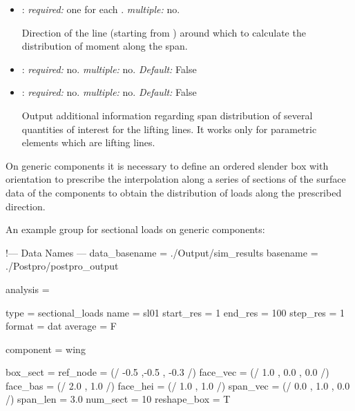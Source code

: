 \begin{itemize}
\item {}: \textit{required:} one for each . 
\textit{multiple:} no.

Direction of the line (starting from ) around which to calculate 
the distribution of moment along the span.

\item {}: \textit{required:} no. \textit{multiple:} no. 
\textit{Default:} False

\item {}: \textit{required:} no. \textit{multiple:} no. 
\textit{Default:} False

Output additional information regarding span distribution of several quantities 
of interest for the lifting lines. It works only for parametric elements which 
are lifting lines.

\end{itemize}

On generic components it is necessary to define an ordered slender box with 
orientation to prescribe the interpolation along a series of sections of the 
surface data of the components to obtain the distribution of loads along the 
prescribed direction.

An example  group for sectional loads on generic components:

\begin{inputfile}[frame=single, caption={dust\_post.in for sectional load on 
  generic components}, label={file:dust_post.in_sectional_param}]
!--- Data Names ---
data_basename = ./Output/sim_results
basename =     ./Postpro/postpro_output

analysis = {

type = sectional_loads
name = sl01
start_res = 1
end_res   = 100 
step_res  = 1
format = dat
average = F

component = wing

box_sect = {
  ref_node = (/ -0.5 ,-0.5 , -0.3 /)
  face_vec = (/ 1.0 , 0.0 , 0.0 /)
  face_bas = (/ 2.0 , 1.0 /) 
  face_hei = (/ 1.0 , 1.0 /)
  span_vec = (/ 0.0 , 1.0 , 0.0 /)
  span_len = 3.0
  num_sect = 10
  reshape_box = T 
} 


}
\end{inputfile}


